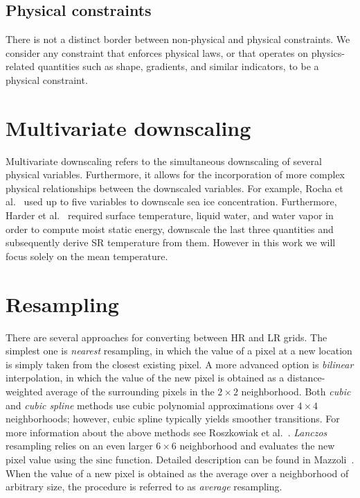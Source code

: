 \subsection{Physical constraints}

There is not a distinct border between non-physical and physical constraints.
We consider any constraint that enforces physical laws, or that operates on physics-related quantities such as shape, gradients, and similar indicators, to be a physical constraint.

\section{Multivariate downscaling}

Multivariate downscaling refers to the simultaneous downscaling of several physical variables.
Furthermore, it allows for the incorporation of more complex physical relationships between the downscaled variables.
For example, Rocha et al.~\cite{Rocha2025} used up to five variables to downscale sea ice concentration.
Furthermore, Harder et al.~\cite{Harder2023} required surface temperature, liquid water, and water vapor in order to compute moist static energy, downscale the last three quantities and subsequently derive SR temperature from them.
However in this work we will focus solely on the mean temperature.

\section{Resampling}

There are several approaches for converting between HR and LR grids.
The simplest one is \textit{nearest} resampling, in which the value of a pixel at a new location is simply taken from the closest existing pixel.
A more advanced option is \textit{bilinear} interpolation, in which the value of the new pixel is obtained as a distance-weighted average of the surrounding pixels in the $2 \times 2$ neighborhood.
Both \textit{cubic} and \textit{cubic spline} methods use cubic polynomial approximations over $4 \times 4$ neighborhoods; however, cubic spline typically yields smoother transitions.
For more information about the above methods see Roszkowiak et al.~\cite{Roszkowiak2017}.
\textit{Lanczos} resampling relies on an even larger $6 \times 6$ neighborhood and evaluates the new pixel value using the $\text{sinc}$ function.
Detailed description can be found in Mazzoli~\cite{Mazzoli2026}.
When the value of a new pixel is obtained as the average over a neighborhood of arbitrary size, the procedure is referred to as \textit{average} resampling.
